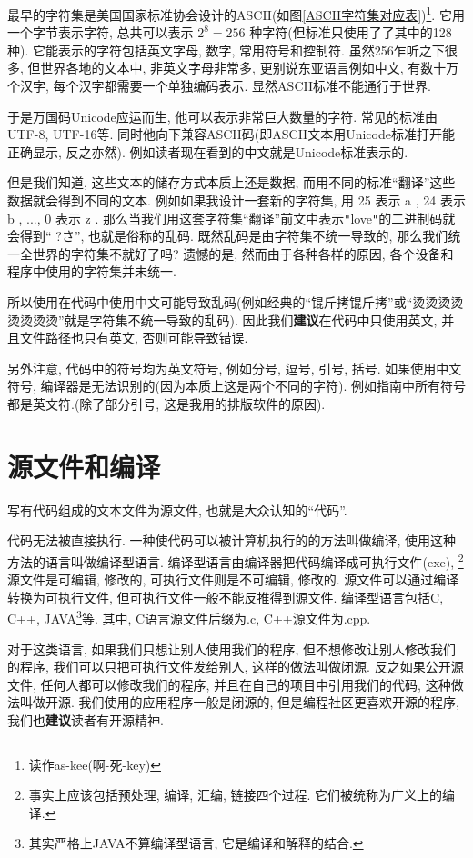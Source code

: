         最早的字符集是美国国家标准协会设计的ASCII(如图\ref{ASCII字符集对应表})\footnote{读作as-kee(啊-死-key)}. 它用一个字节表示字符, 总共可以表示 $ 2 ^ 8 = 256 $ 种字符(但标准只使用了了其中的128种). 它能表示的字符包括英文字母, 数字, 常用符号和控制符. 虽然256乍听之下很多, 但世界各地的文本中, 非英文字母非常多, 更别说东亚语言例如中文, 有数十万个汉字, 每个汉字都需要一个单独编码表示. 显然ASCII标准不能通行于世界.

        于是万国码Unicode应运而生, 他可以表示非常巨大数量的字符. 常见的标准由UTF-8, UTF-16等. 同时他向下兼容ASCII码(即ASCII文本用Unicode标准打开能正确显示, 反之亦然). 例如读者现在看到的中文就是Unicode标准表示的.

        但是我们知道, 这些文本的储存方式本质上还是数据, 而用不同的标准``翻译''这些数据就会得到不同的文本. 例如如果我设计一套新的字符集, 用 25 表示 a , 24 表示 b , ..., 0 表示 z . 那么当我们用这套字符集``翻译''前文中表示\texttt{"}love\texttt{"}的二进制码就会得到`` ?\makebox[0pt][r]{$ \ \square$}さ'', 也就是俗称的乱码. 既然乱码是由字符集不统一导致的, 那么我们统一全世界的字符集不就好了吗? 遗憾的是, 然而由于各种各样的原因, 各个设备和程序中使用的字符集并未统一.
        
        所以使用在代码中使用中文可能导致乱码(例如经典的``锟斤拷锟斤拷''或``烫烫烫烫烫烫烫烫''就是字符集不统一导致的乱码). 因此我们\textbf{建议}在代码中只使用英文, 并且文件路径也只有英文, 否则可能导致错误.

        另外注意, 代码中的符号均为英文符号, 例如分号, 逗号, 引号, 括号. 如果使用中文符号, 编译器是无法识别的(因为本质上这是两个不同的字符). 例如指南中所有符号都是英文符.(除了部分引号, 这是我用的排版软件的原因).
        
    \section{源文件和编译}
        写有代码组成的文本文件为源文件, 也就是大众认知的``代码''. 
        
        代码无法被直接执行. 一种使代码可以被计算机执行的的方法叫做编译, 使用这种方法的语言叫做编译型语言. 编译型语言由编译器把代码编译成可执行文件(exe), \footnote{事实上应该包括预处理, 编译, 汇编, 链接四个过程. 它们被统称为广义上的编译.} 源文件是可编辑, 修改的, 可执行文件则是不可编辑, 修改的. 源文件可以通过编译转换为可执行文件, 但可执行文件一般不能反推得到源文件. 编译型语言包括C, C++, JAVA\footnote{其实严格上JAVA不算编译型语言, 它是编译和解释的结合.}等. 其中, C语言源文件后缀为.c, C++源文件为.cpp.
        
        对于这类语言, 如果我们只想让别人使用我们的程序, 但不想修改让别人修改我们的程序, 我们可以只把可执行文件发给别人, 这样的做法叫做闭源. 反之如果公开源文件, 任何人都可以修改我们的程序, 并且在自己的项目中引用我们的代码, 这种做法叫做开源. 我们使用的应用程序一般是闭源的, 但是编程社区更喜欢开源的程序, 我们也\textbf{建议}读者有开源精神.

